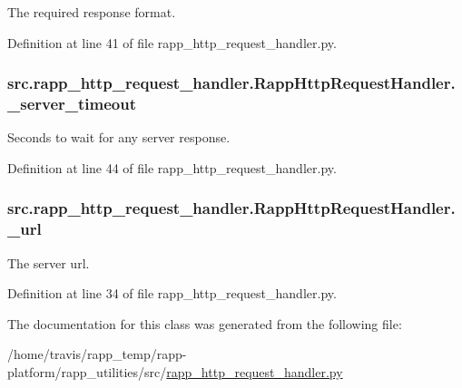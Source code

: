 The required response format. 



Definition at line 41 of file rapp\-\_\-http\-\_\-request\-\_\-handler.\-py.

\hypertarget{classsrc_1_1rapp__http__request__handler_1_1RappHttpRequestHandler_af4fec78b4cff29204738ac5169622a88}{
\subsubsection[{\-\_\-server\-\_\-timeout}]{\setlength{\rightskip}{0pt plus 5cm}src.\-rapp\-\_\-http\-\_\-request\-\_\-handler.\-Rapp\-Http\-Request\-Handler.\-\_\-server\-\_\-timeout\hspace{0.3cm}{\ttfamily [private]}}}\label{classsrc_1_1rapp__http__request__handler_1_1RappHttpRequestHandler_af4fec78b4cff29204738ac5169622a88}


Seconds to wait for any server response. 



Definition at line 44 of file rapp\-\_\-http\-\_\-request\-\_\-handler.\-py.

\hypertarget{classsrc_1_1rapp__http__request__handler_1_1RappHttpRequestHandler_abafcaefc660c7ac4b01a14b2d44c358b}{
\subsubsection[{\-\_\-url}]{\setlength{\rightskip}{0pt plus 5cm}src.\-rapp\-\_\-http\-\_\-request\-\_\-handler.\-Rapp\-Http\-Request\-Handler.\-\_\-url\hspace{0.3cm}{\ttfamily [private]}}}\label{classsrc_1_1rapp__http__request__handler_1_1RappHttpRequestHandler_abafcaefc660c7ac4b01a14b2d44c358b}


The server url. 



Definition at line 34 of file rapp\-\_\-http\-\_\-request\-\_\-handler.\-py.



The documentation for this class was generated from the following file\-:\begin{DoxyCompactItemize}
\item 
/home/travis/rapp\-\_\-temp/rapp-\/platform/rapp\-\_\-utilities/src/\hyperlink{rapp__http__request__handler_8py}{rapp\-\_\-http\-\_\-request\-\_\-handler.\-py}\end{DoxyCompactItemize}
